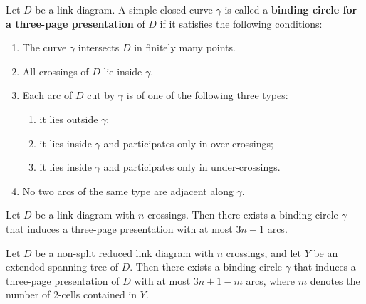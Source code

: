 \documentclass[10pt,a4paper]{amsart}
\begin{document}
\begin{definition} \label{def:binding-circle}
Let $D$ be a link diagram.
A simple closed curve $\gamma$ is called a \textbf{binding circle for a three-page presentation} of $D$ if it satisfies the following conditions:
\begin{enumerate}
    \item The curve $\gamma$ intersects $D$ in finitely many points.
    \item All crossings of $D$ lie inside $\gamma$.
    \item Each arc of $D$ cut by $\gamma$ is of one of the following three types:
    \begin{enumerate}
        \item it lies outside $\gamma$;
        \item it lies inside $\gamma$ and participates only in over-crossings;
        \item it lies inside $\gamma$ and participates only in under-crossings.
    \end{enumerate}
    \item No two arcs of the same type are adjacent along $\gamma$.
\end{enumerate}
\end{definition}

\begin{lemma} \label{lem:binding-circle-existence}
Let $D$ be a link diagram with $n$ crossings.
Then there exists a binding circle $\gamma$ that induces a three-page presentation with at most $3n+1$ arcs.
\end{lemma}

\begin{lemma} \label{lem:extended}
Let $D$ be a non-split reduced link diagram with $n$ crossings, and let $Y$ be an extended spanning tree of $D$.
Then there exists a binding circle $\gamma$ that induces a three-page presentation of $D$ with at most $3n+1-m$ arcs,
where $m$ denotes the number of $2$-cells contained in $Y$.
\end{lemma}
\end{document}
